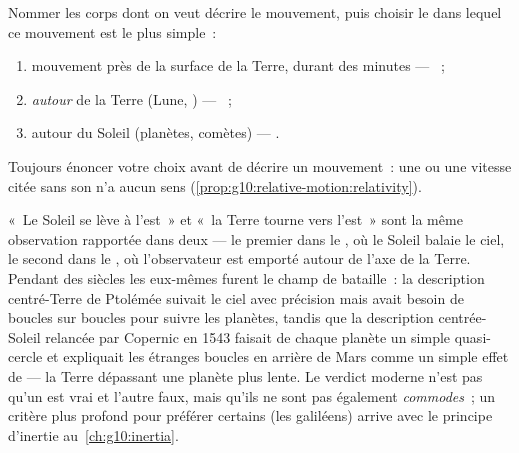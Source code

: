\begin{method}\label{met:g10:relative-motion:choose}
Nommer les corps dont on veut décrire le mouvement, puis choisir le
 dans lequel ce mouvement est le plus simple~:
\begin{enumerate}
  \item mouvement près de la surface de la Terre, durant des minutes
        --- ~;
  \item {} \emph{autour} de la Terre (Lune,
        ) --- ~;
  \item {} autour du Soleil (planètes, comètes) ---
        .
\end{enumerate}
Toujours énoncer votre choix avant de décrire un mouvement~: une
 ou une vitesse citée sans son 
n'a aucun sens (\cref{prop:g10:relative-motion:relativity}).
\end{method}

\begin{remark}\label{rem:g10:relative-motion:history}
«~Le Soleil se lève à l'est~» et «~la Terre tourne vers l'est~» sont
la même observation rapportée dans deux  --- le premier
dans le , où le Soleil balaie le ciel, le
second dans le , où l'observateur est
emporté autour de l'axe de la Terre. Pendant des siècles les
 eux-mêmes furent le champ de bataille~: la description
centré-Terre de Ptolémée suivait le ciel avec précision mais avait
besoin de boucles sur boucles pour suivre les planètes, tandis que la
description centrée-Soleil relancée par Copernic en 1543 faisait de
chaque planète un simple quasi-cercle et expliquait les étranges
boucles en arrière de Mars comme un simple effet de  --- la
Terre dépassant une planète plus lente. Le verdict moderne n'est pas
qu'un  est vrai et l'autre faux, mais qu'ils ne sont pas
également \emph{commodes}~; un critère plus profond pour préférer
certains  (les  galiléens) arrive avec le
principe d'inertie au~\cref{ch:g10:inertia}.
\end{remark}

